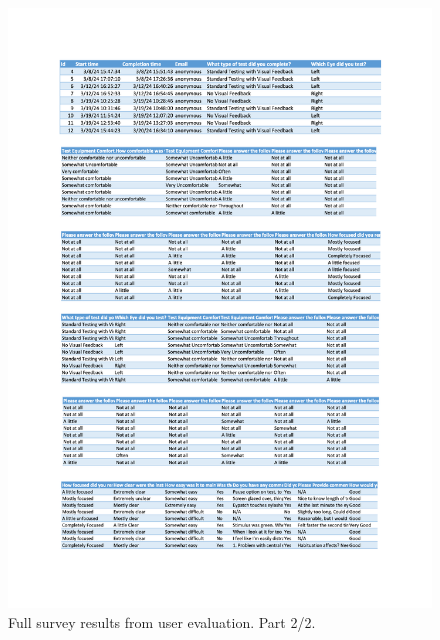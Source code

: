 \documentclass{l4proj}
\begin{document}
\begin{appendices}
\begin{figure}[htbp]
    \includegraphics[page=2,width=1\linewidth]{dissertation/images/Full results.pdf}   
    \caption{Full survey results from user evaluation. Part 2/2.}
\end{figure}
\end{appendices}






\end{document}
